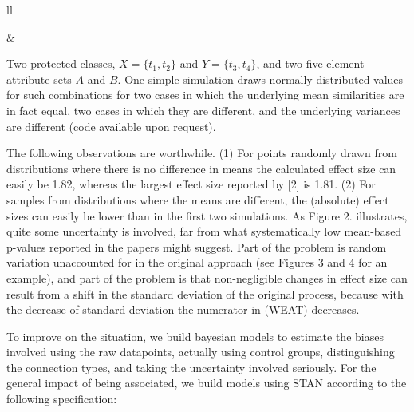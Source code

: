 \documentclass[
  12pt,
  dvipsnames,enabledeprecatedfontcommands]{scrartcl}
\begin{document}
\noindent

\begin{tabular}{ll}
\begin{minipage}[c]{0.35\linewidth}
\end{minipage}& \begin{minipage}[c]{0.6\linewidth}

Two protected classes, $X=\{t_1,t_2\}$ and $Y=\{t_3,t_4\}$, and two five-element attribute sets $A$ and $B$. One simple simulation draws normally distributed values for such combinations for two cases in which the underlying mean similarities are in fact equal, two cases in which they are different, and the underlying variances are different (code available upon request).
\end{minipage}
\end{tabular}

\vspace{1mm}

The following observations are worthwhile. (1) For points randomly drawn
from distributions where there is no difference in means the calculated
effect size can easily be 1.82, whereas the largest effect size reported
by {[}2{]} is 1.81. (2) For samples from distributions where the means
are different, the (absolute) effect sizes can easily be lower than in
the first two simulations. As Figure 2. illustrates, quite some
uncertainty is involved, far from what systematically low mean-based
p-values reported in the papers might suggest. Part of the problem is
random variation unaccounted for in the original approach (see Figures 3
and 4 for an example), and part of the problem is that non-negligible
changes in effect size can result from a shift in the standard deviation
of the original process, because with the decrease of standard deviation
the numerator in (WEAT) decreases.

To improve on the situation, we build bayesian models to estimate the
biases involved using the raw datapoints, actually using control groups,
distinguishing the connection types, and taking the uncertainty involved
seriously. For the general impact of being associated, we build models
using STAN according to the following specification:
\end{document}

